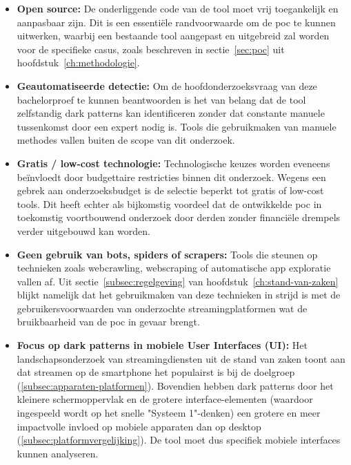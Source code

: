 \begin{itemize}
    \item \textbf{Open source:} De onderliggende code van de tool moet vrij toegankelijk en aanpasbaar zijn. Dit is een essentiële randvoorwaarde om de \acrshort{poc} te kunnen uitwerken, waarbij een bestaande tool aangepast en uitgebreid zal worden voor de specifieke casus, zoals beschreven in sectie~\ref{sec:poc} uit hoofdstuk~\ref{ch:methodologie}.
    
    \item \textbf{Geautomatiseerde detectie:} Om de hoofdonderzoeksvraag van deze bachelorproef te kunnen beantwoorden is het van belang dat de tool zelfstandig dark patterns kan identificeren zonder dat constante manuele tussenkomst door een expert nodig is. Tools die gebruikmaken van manuele methodes vallen buiten de scope van dit onderzoek.
    
    \item \textbf{Gratis / low-cost technologie:} Technologische keuzes worden eveneens beïnvloedt door budgettaire restricties binnen dit onderzoek. Wegens een gebrek aan onderzoeksbudget is de selectie beperkt tot gratis of low-cost tools. Dit heeft echter als bijkomstig voordeel dat de ontwikkelde \acrlong{poc} in toekomstig voortbouwend onderzoek door derden zonder financiële drempels verder uitgebouwd kan worden.
    
    \item \textbf{Geen gebruik van bots, spiders of scrapers:} Tools die steunen op technieken zoals webcrawling, webscraping of automatische app exploratie vallen af. Uit sectie~\ref{subsec:regelgeving} van hoofdstuk~\ref{ch:stand-van-zaken} blijkt namelijk dat het gebruikmaken van deze technieken in strijd is met de gebruikersvoorwaarden van onderzochte streamingplatformen wat de bruikbaarheid van de \acrshort{poc} in gevaar brengt.   

    \newpage
    
    \item \textbf{Focus op dark patterns in mobiele User Interfaces (UI):} Het landschapsonderzoek van streamingdiensten uit de stand van zaken toont aan dat streamen op de smartphone het populairst is bij de doelgroep (\ref{subsec:apparaten-platformen}). Bovendien hebben dark patterns door het kleinere schermoppervlak en de grotere interface-elementen (waardoor ingespeeld wordt op het snelle "Systeem 1"-denken) een grotere en meer impactvolle invloed op mobiele apparaten dan op desktop (\ref{subsec:platformvergelijking}). De tool moet dus specifiek mobiele interfaces kunnen analyseren.
    

\end{itemize}
